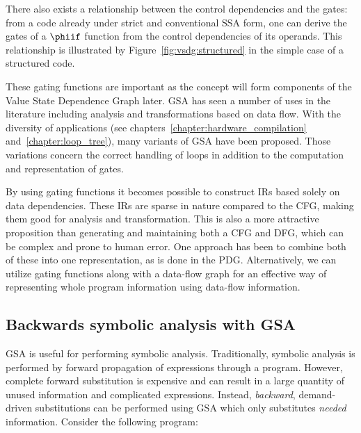 There also exists a relationship between the control dependencies and the gates: 
from a code already under strict and conventional SSA form, one can derive the gates of a $\phiif$ function from the control dependencies of its operands. 
This relationship is illustrated by Figure~\ref{fig:vsdg:structured} in the simple case of a structured code.
 
These gating functions are important as the concept will form components of the Value State Dependence Graph later. 
GSA has seen a number of uses in the literature including analysis and transformations based on data flow. 
With the diversity of applications (see chapters~\ref{chapter:hardware_compilation} and~\ref{chapter:loop_tree}), many variants of GSA have been proposed. 
Those variations concern the correct handling of loops in addition to the computation and representation of gates.


By using gating functions it becomes possible to construct IRs based solely on data dependencies. 
These IRs are sparse in nature compared to the CFG, making them good for analysis and transformation. 
This is also a more attractive proposition than generating and maintaining both a CFG and DFG, which can be complex and prone to human error. 
One approach has been to combine both of these into one representation, as is done in the PDG. 
Alternatively, we can utilize gating functions along with a data-flow graph for an effective way of representing whole program information using data-flow information.

\subsection{Backwards symbolic analysis with GSA}
GSA is useful for performing symbolic analysis. 
Traditionally, symbolic analysis is performed by forward propagation of expressions through a program. 
However, complete forward substitution is expensive and can result in a large quantity of unused information and complicated expressions. 
Instead, \textit{backward}, demand-driven substitutions can be performed using GSA which only substitutes \textit{needed} information. 
Consider the following program:

